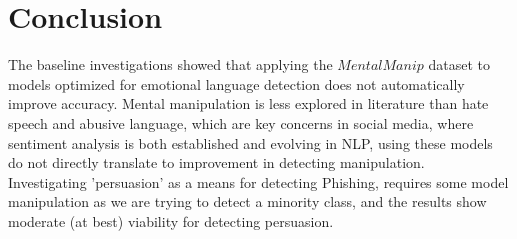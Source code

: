 \documentclass[
	letterpaper, %
	12pt, %
	unnumberedsections, %
	twoside, %
]{LTJournalArticle}
\begin{document}
\section{Conclusion}

The baseline investigations showed that applying the $MentalManip$ dataset to models optimized for emotional language detection does not automatically improve accuracy. Mental manipulation is less explored in literature than hate speech and abusive language, which are key concerns in social media, where sentiment analysis is both established and evolving in NLP, using these models do not directly translate to improvement in detecting manipulation. \\
Investigating 'persuasion' as a means for detecting Phishing, requires some model manipulation as we are trying to detect a minority class, and the results show moderate (at best) viability for detecting persuasion.




\clearpage
\onecolumn
\printbibliography %

\appendix
{}
\end{document}
